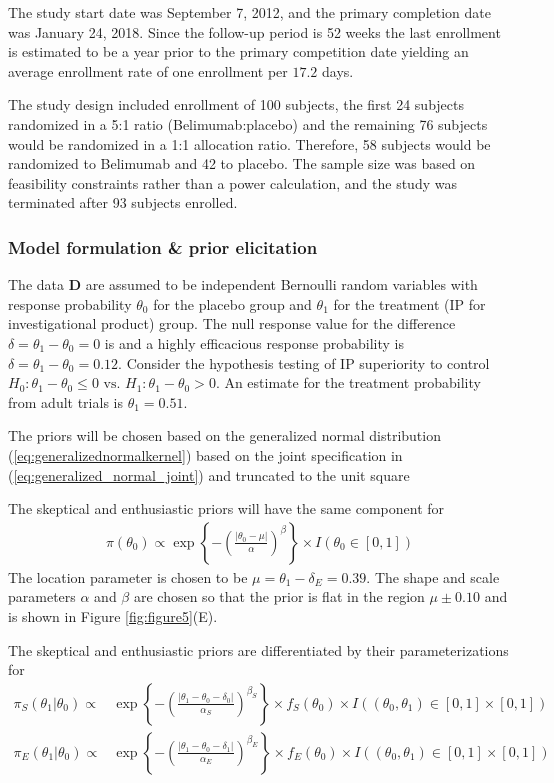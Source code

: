 \documentclass[12pt]{article}
\begin{document}
The study start date was September 7, 2012, and the primary completion date was January 24, 2018. Since the follow-up period is 52 weeks the last enrollment is estimated to be a year prior to the primary competition date yielding an average enrollment rate of one enrollment per $17.2$ days.

The study design included enrollment of 100 subjects, the first 24 subjects randomized in a 5:1 ratio (Belimumab:placebo) and the remaining 76 subjects would be randomized in a 1:1 allocation ratio. Therefore, 58 subjects would be randomized to Belimumab and 42 to placebo. The sample size was based on feasibility constraints rather than a power calculation, and the study was terminated after 93 subjects enrolled.

\subsubsection{Model formulation \& prior elicitation}
The data $\mathbf{D}$ are assumed to be independent Bernoulli random variables with response probability $\theta_0$ for the placebo group and $\theta_1$ for the treatment (IP for investigational product) group. The null response value for the difference $\delta=\theta_1-\theta_0=0$ is  and a highly efficacious response probability is $\delta=\theta_1-\theta_0=0.12$. Consider the hypothesis testing of IP superiority to control $H_0:\theta_1-\theta_0\leq 0\text{ vs. }H_1: \theta_1-\theta_0>0$. An estimate for the treatment probability from adult trials is $\theta_1=0.51$.

The priors will be chosen based on the generalized normal distribution (\ref{eq:generalizednormalkernel}) based on the joint specification in (\ref{eq:generalized_normal_joint}) and truncated to the unit square 

The skeptical and enthusiastic priors will have the same component for
\begin{align}
\pi(\theta_0)\propto \exp\left\{-\left(\frac{|\theta_0-\mu|}{\alpha}\right)^{\beta}\right\}\times I(\theta_0 \in [0,1])
\end{align}
The location parameter is chosen to be $\mu=\theta_1-\delta_E=0.39$. The shape and scale parameters $\alpha$ and $\beta$ are chosen so that the prior is flat in the region $\mu\pm 0.10$ and is shown in Figure \ref{fig:figure5}(E). 

The skeptical and enthusiastic priors are differentiated by their parameterizations for 
\begin{align}
\pi_S(\theta_1|\theta_0)\propto&\exp\left\{-\left(\frac{|\theta_1-\theta_0-\delta_0|}{\alpha_S}\right)^{\beta_S}\right\}\times f_S(\theta_0) \times I((\theta_0,\theta_1)\in [0,1]\times[0,1])\\
\pi_E(\theta_1|\theta_0)\propto&\exp\left\{-\left(\frac{|\theta_1-\theta_0-\delta_1|}{\alpha_E}\right)^{\beta_E}\right\}\times f_E(\theta_0) \times I((\theta_0,\theta_1)\in [0,1]\times[0,1])
\end{align}
\end{document}
